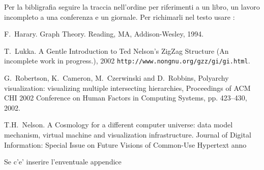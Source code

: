 \documentclass[11pt,a4paper,twoside,openright]{report}
\begin{document}
\newcommand{\infig}[3]{\begin{figure*}[t]
\centerline{\epsfbox{#1}}
\caption{\label{#2} #3} \end{figure*}}
















Per la bibligrafia seguire la traccia nell'ordine per riferimenti a un
libro, un lavoro incompleto a una 
conferenza e un giornale. Per richimarli nel testo usare \cite{H94,RCCR} :

\begin{thebibliography}{10}

F.~Harary. \newblock
Graph Theory. Reading, MA, Addison-Wesley, 1994.

T.~Lukka.  \newblock
A Gentle Introduction to Ted Nelson's ZigZag Structure (An incomplete
work in progress.), 2002 \newblock
{\tt http://www.nongnu.org/gzz/gi/gi.html}.


G.~Robertson, K.~Cameron, M.~Czerwinski and D.~Robbins, \newblock
Polyarchy visualization: visualizing multiple intersecting
hierarchies, \newblock
Proceedings of ACM CHI 2002 Conference on Human Factors in
Computing Systems, pp. 423--430, 2002.


T.H.~Nelson. \newblock
A Cosmology for a different computer universe: data model~ mechanism,
virtual machine and visualization infrastructure.
Journal of Digital Information: Special Issue on Future Visions of
Common-Use Hypertext
anno
\end{thebibliography}


Se c'e' inserire l'enventuale appendice

\end{document}
